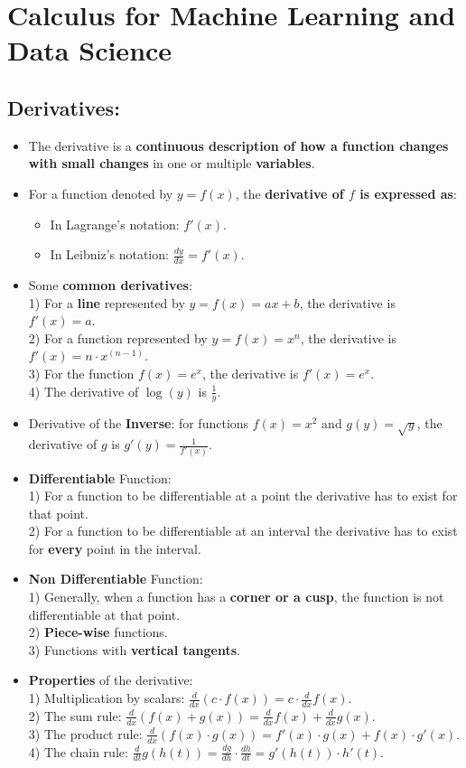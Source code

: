 \documentclass[16pt]{article}
\begin{document}
	\section{Calculus for Machine Learning and Data Science}
	\subsection{Derivatives:}
	\begin{itemize}
		\item The derivative is a \textbf{continuous description of how a function changes with small changes} in one or multiple \textbf{variables}.
		\item For a function denoted by $y = f(x)$, the \textbf{derivative of $f$ is expressed as}:
		\begin{itemize}
			\item In Lagrange's notation: $f'(x)$.
			\item In Leibniz's notation: $\frac{dy}{dx} = f'(x)$.
		\end{itemize}		
		\item Some \textbf{common derivatives}:
		\\
		1) For a \textbf{line} represented by $y = f(x) = ax + b$, the derivative is $f'(x) = a$.		
		\\
		2) For a function represented by $y = f(x) = x^n$, the derivative is $f'(x)=n\cdot x^{(n - 1)}$.				
		\\
		3) For the function $f(x) = e^x$, the derivative is $f'(x) = e^x$.		
		\\
		4) The derivative of $\log(y)$ is $\frac{1}{y}$.
		\item Derivative of the \textbf{Inverse}: for functions $f(x) = x^2$ and $g(y) = \sqrt{y}$, the derivative of $g$ is $g'(y) = \frac{1}{f'(x)}$.
		\item \textbf{Differentiable} Function: 
		\\
		1) For a function to be differentiable at a point the derivative has to exist for that point.
		\\
		2) For a function to be differentiable at an interval the derivative has to exist for \textbf{every} point in the interval.
		\item \textbf{Non Differentiable} Function:
		\\
		1) Generally, when a function has a \textbf{corner or a cusp}, the function is not differentiable at that point.
		\\
		2) \textbf{Piece-wise} functions.
		\\
		3) Functions with \textbf{vertical tangents}.
		\item \textbf{Properties} of the derivative:
		\\
		1) Multiplication by scalars: $ \frac{d}{dx} (c \cdot f(x)) = c \cdot \frac{d}{dx} f(x) $.
		\\
		2) The sum rule: $ \frac{d}{dx} (f(x) + g(x)) = \frac{d}{dx} f(x) + \frac{d}{dx} g(x) $.
		\\
		3) The product rule: $ \frac{d}{dx} (f(x) \cdot g(x)) = f'(x) \cdot g(x) + f(x) \cdot g'(x) $.
		\\
		4) The chain rule: $ \frac{d}{dt} g(h(t)) = \frac{dg}{dh} \cdot \frac{dh}{dt} = g'(h(t)) \cdot h'(t)$. 
	\end{itemize}
\end{document}
